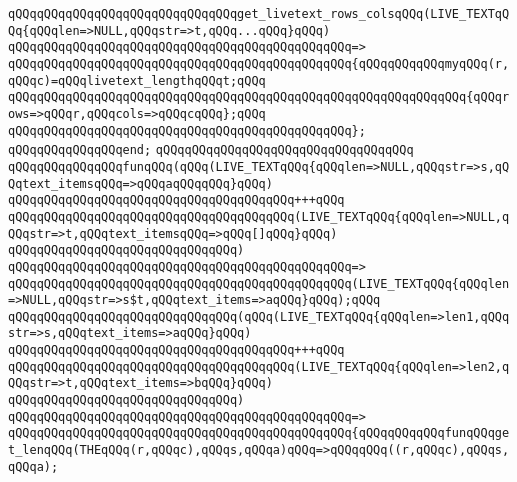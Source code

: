 \newline
\verb|qQQqqQQqqQQqqQQqqQQqqQQqqQQqqQQqget_livetext_rows_colsqQQq(LIVE_TEXTqQQq{qQQqlen=>NULL,qQQqstr=>t,qQQq...qQQq}qQQq)|\newline
\verb|qQQqqQQqqQQqqQQqqQQqqQQqqQQqqQQqqQQqqQQqqQQqqQQq=>|\newline
\verb|qQQqqQQqqQQqqQQqqQQqqQQqqQQqqQQqqQQqqQQqqQQqqQQq{qQQqqQQqqQQqmyqQQq(r,qQQqc)=qQQqlivetext_lengthqQQqt;qQQq|\newline
\verb|qQQqqQQqqQQqqQQqqQQqqQQqqQQqqQQqqQQqqQQqqQQqqQQqqQQqqQQqqQQqqQQq{qQQqrows=>qQQqr,qQQqcols=>qQQqcqQQq};qQQq|\newline
\verb|qQQqqQQqqQQqqQQqqQQqqQQqqQQqqQQqqQQqqQQqqQQqqQQq};|\newline
\verb|qQQqqQQqqQQqqQQqend;|\newline
\verb|qQQqqQQqqQQqqQQqqQQqqQQqqQQqqQQqqQQq|\newline
\verb|qQQqqQQqqQQqqQQqfunqQQq(qQQq(LIVE_TEXTqQQq{qQQqlen=>NULL,qQQqstr=>s,qQQqtext_itemsqQQq=>qQQqaqQQqqQQq}qQQq)|\newline
\verb|qQQqqQQqqQQqqQQqqQQqqQQqqQQqqQQqqQQqqQQq+++qQQq|\newline
\verb|qQQqqQQqqQQqqQQqqQQqqQQqqQQqqQQqqQQqqQQq(LIVE_TEXTqQQq{qQQqlen=>NULL,qQQqstr=>t,qQQqtext_itemsqQQq=>qQQq[]qQQq}qQQq)|\newline
\verb|qQQqqQQqqQQqqQQqqQQqqQQqqQQqqQQq)|\newline
\verb|qQQqqQQqqQQqqQQqqQQqqQQqqQQqqQQqqQQqqQQqqQQqqQQq=>|\newline
\verb|qQQqqQQqqQQqqQQqqQQqqQQqqQQqqQQqqQQqqQQqqQQqqQQq(LIVE_TEXTqQQq{qQQqlen=>NULL,qQQqstr=>s$t,qQQqtext_items=>aqQQq}qQQq);qQQq|\newline
\newline
\verb|qQQqqQQqqQQqqQQqqQQqqQQqqQQqqQQq(qQQq(LIVE_TEXTqQQq{qQQqlen=>len1,qQQqstr=>s,qQQqtext_items=>aqQQq}qQQq)|\newline
\verb|qQQqqQQqqQQqqQQqqQQqqQQqqQQqqQQqqQQqqQQq+++qQQq|\newline
\verb|qQQqqQQqqQQqqQQqqQQqqQQqqQQqqQQqqQQqqQQq(LIVE_TEXTqQQq{qQQqlen=>len2,qQQqstr=>t,qQQqtext_items=>bqQQq}qQQq)|\newline
\verb|qQQqqQQqqQQqqQQqqQQqqQQqqQQqqQQq)|\newline
\verb|qQQqqQQqqQQqqQQqqQQqqQQqqQQqqQQqqQQqqQQqqQQqqQQq=>|\newline
\verb|qQQqqQQqqQQqqQQqqQQqqQQqqQQqqQQqqQQqqQQqqQQqqQQq{qQQqqQQqqQQqfunqQQqget_lenqQQq(THEqQQq(r,qQQqc),qQQqs,qQQqa)qQQq=>qQQqqQQq((r,qQQqc),qQQqs,qQQqa);|\newline
